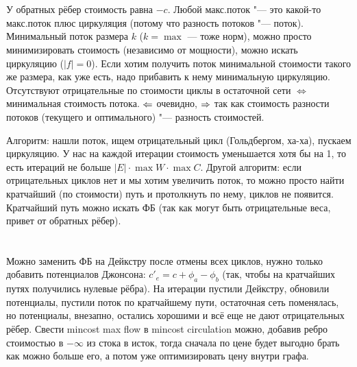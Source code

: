 \section{} %
У обратных рёбер стоимость равна $-c$.
Любой макс.поток "--- это какой-то макс.поток плюс циркуляция (потому что разность потоков "--- поток).
Минимальный поток размера $k$ ($k=\max$ --- тоже норм), можно просто минимизировать стоимость (независимо от мощности), можно искать циркуляцию ($|f|=0$).
Если хотим получить поток минимальной стоимости такого же размера, как уже есть, надо прибавить к нему минимальную циркуляцию.
Отсутствуют отрицательные по стоимости циклы в остаточной сети $\iff$ минимальная стоимость потока.
$\Leftarrow$ очевидно, $\Rightarrow$ так как стоимость разности потоков (текущего и оптимального) "--- разность стоимостей.

Алгоритм: нашли поток, ищем отрицательный цикл (Гольдбергом, ха-ха), пускаем циркуляцию.
У нас на каждой итерации стоимость уменьшается хотя бы на 1, то есть итераций не больше $|E| \cdot \max W \cdot \max C$.
Другой алгоритм: если отрицательных циклов нет и мы хотим увеличить поток, то можно просто найти кратчайший (по стоимости) путь и протолкнуть по нему, циклов не появится.
Кратчайший путь можно искать ФБ (так как могут быть отрицательные веса, привет от обратных рёбер).

\section{} %
Можно заменить ФБ на Дейкстру после отмены всех циклов, нужно только добавить потенциалов Джонсона: $c'_e = c + \phi_a - \phi_b$
(так, чтобы на кратчайших путях получились нулевые рёбра).
На итерации пустили Дейкстру, обновили потенциалы, пустили поток по кратчайшему пути, остаточная сеть поменялась, но потенциалы, внезапно, остались хорошими и всё еще не дают отрицательных рёбер.
Свести mincost max flow в mincost circulation можно, добавив ребро стоимостью в $-\infty$ из стока в исток, тогда сначала по цене будет выгодно брать как можно больше его, а потом уже оптимизировать цену внутри графа.

\section{} %
\TODO

\section{} %
\TODO
